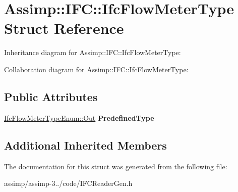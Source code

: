 \hypertarget{struct_assimp_1_1_i_f_c_1_1_ifc_flow_meter_type}{\section{Assimp\+:\+:I\+F\+C\+:\+:Ifc\+Flow\+Meter\+Type Struct Reference}
\label{struct_assimp_1_1_i_f_c_1_1_ifc_flow_meter_type}
}


Inheritance diagram for Assimp\+:\+:I\+F\+C\+:\+:Ifc\+Flow\+Meter\+Type\+:


Collaboration diagram for Assimp\+:\+:I\+F\+C\+:\+:Ifc\+Flow\+Meter\+Type\+:
\subsection*{Public Attributes}
\begin{DoxyCompactItemize}
\item 
\hypertarget{struct_assimp_1_1_i_f_c_1_1_ifc_flow_meter_type_a15875ea4b3c038d0209acc322cecdf49}{\hyperlink{classboost_1_1shared__ptr}{Ifc\+Flow\+Meter\+Type\+Enum\+::\+Out} {\bfseries Predefined\+Type}}\label{struct_assimp_1_1_i_f_c_1_1_ifc_flow_meter_type_a15875ea4b3c038d0209acc322cecdf49}

\end{DoxyCompactItemize}
\subsection*{Additional Inherited Members}


The documentation for this struct was generated from the following file\+:\begin{DoxyCompactItemize}
\item 
assimp/assimp-\/3../code/I\+F\+C\+Reader\+Gen.\+h\end{DoxyCompactItemize}

